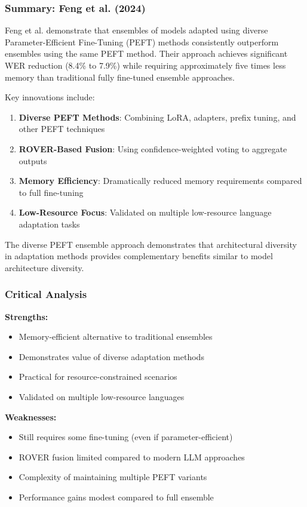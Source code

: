 \subsubsection{Summary: Feng et al. (2024)}

Feng et al. \cite{feng2024} demonstrate that ensembles of models adapted using diverse Parameter-Efficient Fine-Tuning (PEFT) methods consistently outperform ensembles using the same PEFT method. Their approach achieves significant WER reduction (8.4\% to 7.9\%) while requiring approximately five times less memory than traditional fully fine-tuned ensemble approaches.

Key innovations include:

\begin{enumerate}[topsep=6pt,itemsep=3pt]
    \item \textbf{Diverse PEFT Methods}: Combining LoRA, adapters, prefix tuning, and other PEFT techniques
    \item \textbf{ROVER-Based Fusion}: Using confidence-weighted voting to aggregate outputs
    \item \textbf{Memory Efficiency}: Dramatically reduced memory requirements compared to full fine-tuning
    \item \textbf{Low-Resource Focus}: Validated on multiple low-resource language adaptation tasks
\end{enumerate}

The diverse PEFT ensemble approach demonstrates that architectural diversity in adaptation methods provides complementary benefits similar to model architecture diversity.

\subsubsection{Critical Analysis}

\textbf{Strengths:}
\begin{itemize}[topsep=4pt,itemsep=2pt]
    \item Memory-efficient alternative to traditional ensembles
    \item Demonstrates value of diverse adaptation methods
    \item Practical for resource-constrained scenarios
    \item Validated on multiple low-resource languages
\end{itemize}

\textbf{Weaknesses:}
\begin{itemize}[topsep=4pt,itemsep=2pt]
    \item Still requires some fine-tuning (even if parameter-efficient)
    \item ROVER fusion limited compared to modern LLM approaches
    \item Complexity of maintaining multiple PEFT variants
    \item Performance gains modest compared to full ensemble
\end{itemize}


